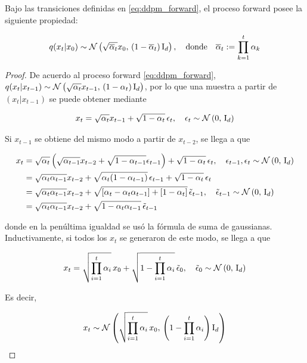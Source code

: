 \begin{prop}
    \label{prop:forward_marginal}
    Bajo las transiciones definidas en \eqref{eq:ddpm_forward}, el proceso forward posee la siguiente propiedad:

    \begin{equation}
        \label{eq:forward_marginal}
        q(x_t|x_0)\sim\mathcal{N}\left(\sqrt{\overline{\alpha}_t}x_0,\,(1-\overline{\alpha}_t)\operatorname{I}_{d}\right),
        \quad\text{donde}\quad
        \overline{\alpha}_t := \prod\limits_{k=1}^t \alpha_k
    \end{equation}
\end{prop}

\begin{proof}

    De acuerdo al proceso forward \eqref{eq:ddpm_forward}, $q(x_t|x_{t-1}) \sim \mathcal{N}\left(\sqrt{\alpha_t} x_{t-1},\,(1-\alpha_t)\operatorname{I}_{d}\right)$, por lo que una muestra a partir de $(x_t|x_{t-1})$ se puede obtener mediante

    \begin{equation*}
        x_t = \sqrt{\alpha_t} x_{t-1} + \sqrt{1-\alpha_t}\, \epsilon_t,
        \quad
        \epsilon_t\sim\mathcal{N}\left(0,\,\operatorname{I}_{d}\right)
    \end{equation*}

    Si $x_{t-1}$ se obtiene del mismo modo a partir de $x_{t-2}$, se llega a que

    \begin{align*}
        x_t &= \sqrt{\alpha_t} \left(\sqrt{\alpha_{t-1}} x_{t-2} + \sqrt{1-\alpha_{t-1}} \epsilon_{t-1}\right) + \sqrt{1-\alpha_t}\, \epsilon_t, \quad \epsilon_{t-1},\epsilon_t\sim\mathcal{N}\left(0,\,\operatorname{I}_{d}\right)\\
        &= \sqrt{\alpha_t\alpha_{t-1}} x_{t-2} + \sqrt{\alpha_t(1-\alpha_{t-1})}\,\epsilon_{t-1} + \sqrt{1-\alpha_t}\,\epsilon_t\\
        &= \sqrt{\alpha_t\alpha_{t-1}} x_{t-2} + \sqrt{[\alpha_t-\alpha_t\alpha_{t-1}]+[1-\alpha_t]}\, \tilde{\epsilon}_{t-1},\quad\tilde{\epsilon}_{t-1}\sim\mathcal{N}\left(0,\,\operatorname{I}_{d}\right)\\\
        &= \sqrt{\alpha_t\alpha_{t-1}} x_{t-2} + \sqrt{1-\alpha_t\alpha_{t-1}}\, \tilde{\epsilon}_{t-1}
    \end{align*}

    donde en la penúltima igualdad se usó la fórmula de suma de gaussianas. Inductivamente, si todos los $x_t$ se generaron de este modo, se llega a que

    \begin{equation*}
        x_t = \sqrt{\prod_{i=1}^t \alpha_i}\, x_0 + \sqrt{1-\prod_{i=1}^t \alpha_i}\, \tilde{\epsilon}_0,
        \quad\tilde{\epsilon}_0\sim\mathcal{N}\left(0,\,\operatorname{I}_{d}\right)
    \end{equation*}

    Es decir,

    \begin{equation*}
        x_t\sim\mathcal{N}\left(\sqrt{\prod_{i=1}^t \alpha_i}\, x_0,\,\left(1-\prod_{i=1}^t \alpha_i\right)\operatorname{I}_{d}\right)
    \end{equation*}
\end{proof}

